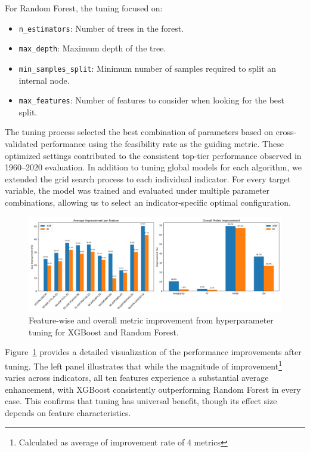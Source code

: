\documentclass[12pt]{article}
\begin{document}
For Random Forest, the tuning focused on:
\begin{itemize}
    \item \texttt{n\_estimators}: Number of trees in the forest.
    \item \texttt{max\_depth}: Maximum depth of the tree.
    \item \texttt{min\_samples\_split}: Minimum number of samples required to split an internal node.
    \item \texttt{max\_features}: Number of features to consider when looking for the best split.
\end{itemize}

The tuning process selected the best combination of parameters based on cross-validated performance using the feasibility rate as the guiding metric. These optimized settings contributed to the consistent top-tier performance observed in 1960–2020 evaluation.
In addition to tuning global models for each algorithm, we extended the grid search process to each individual indicator. For every target variable, the model was trained and evaluated under multiple parameter combinations, allowing us to select an indicator-specific optimal configuration. \begin{figure}[H]
    \centering
    \includegraphics[width=\textwidth]{featurewise_and_modelwise_improvement.png}
    \caption{Feature-wise and overall metric improvement from hyperparameter tuning for XGBoost and Random Forest.}
    \label{fig:tuning_combined}
\end{figure}

Figure~\ref{fig:tuning_combined} provides a detailed visualization of the performance improvements after tuning. The left panel illustrates that while the magnitude of improvement\footnote{Calculated as average of improvement rate of 4 metrics} varies across indicators, all ten features experience a substantial average enhancement, with XGBoost consistently outperforming Random Forest in every case. This confirms that tuning has universal benefit, though its effect size depends on feature characteristics.
\end{document}
